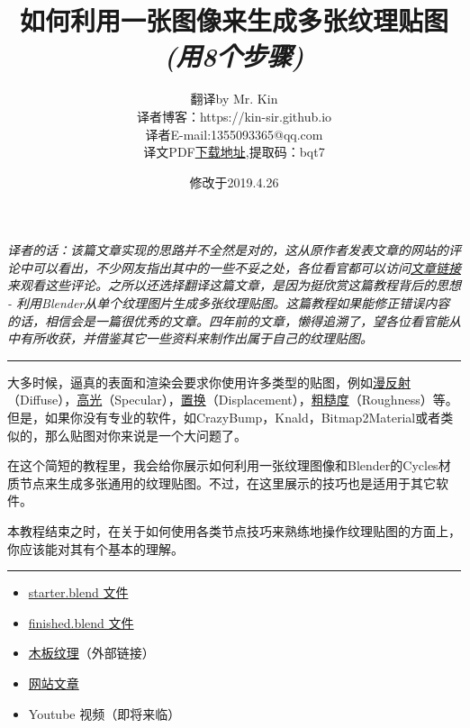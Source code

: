 \documentclass[11pt,a4paper,UTF8]{ctexart}
\title{\textbf{如何利用一张图像来生成多张纹理贴图}\\ \emph{\small{\CJKfontspec[FakeSlant = 0.2]{STSong}(用8个步骤)}}}
\author{翻译by Mr. Kin\\ 译者博客：https://kin-sir.github.io \\译者E-mail:1355093365@qq.com \\译文PDF\href{https://pan.baidu.com/s/14aZk-tkii_cgBtUj9LVtoQ}{下载地址},提取码：bqt7 }
\date{修改于2019.4.26}
\begin{document}
\maketitle

\noindent \emph{译者的话：该篇文章实现的思路并不全然是对的，这从原作者发表文章的网站的评论中可以看出，不少网友指出其中的一些不妥之处，各位看官都可以访问\href{http://www.reynantemartinez.com/how-to-generate-texture-maps-from-a-single-image}{文章链接}来观看这些评论。之所以还选择翻译这篇文章，是因为挺欣赏这篇教程背后的思想 - 利用Blender从单个纹理图片生成多张纹理贴图。这篇教程如果能修正错误内容的话，相信会是一篇很优秀的文章。四年前的文章，懒得追溯了，望各位看官能从中有所收获，并借鉴其它一些资料来制作出属于自己的纹理贴图。}

\noindent \rule[5pt]{500pt}{.5pt}

大多时候，逼真的表面和渲染会要求你使用许多类型的贴图，例如\underline{漫反射}（Diffuse），\underline{高光}（Specular），\underline{置换}（Displacement），\underline{粗糙度}（Roughness）等。但是，如果你没有专业的软件，如CrazyBump，Knald，Bitmap2Material或者类似的，那么贴图对你来说是一个大问题了。

在这个简短的教程里，我会给你展示如何利用一张纹理图像和Blender的Cycles材质节点来生成多张通用的纹理贴图。不过，在这里展示的技巧也是适用于其它软件。

本教程结束之时，在关于如何使用各类节点技巧来熟练地操作纹理贴图的方面上，你应该能对其有个基本的理解。

\noindent \rule[-.4pt]{500pt}{.5pt}

\begin{itemize}
    \item \href{http://www.weebly.com/uploads/4/7/3/9/4739042/texture_map_generator-starter_file_by_reynante_martinez.blend}{starter.blend 文件}
    \item \href{http://www.weebly.com/uploads/4/7/3/9/4739042/texture_map_generator-finished_file_by_reynante_martinez.blend}{finished.blend 文件}
    \item \href{http://cgtextures.com/texview.php?id=12892&PHPSESSID=seph6oah7l4b965vnhm4qam9r5}{木板纹理}（外部链接）
\end{itemize}

\begin{itemize}
    \item \href{http://www.reynantemartinez.com/how-to-generate-texture-maps-from-a-single-image}{网站文章}
    \item Youtube 视频（即将来临）
\end{itemize}
\end{document}
